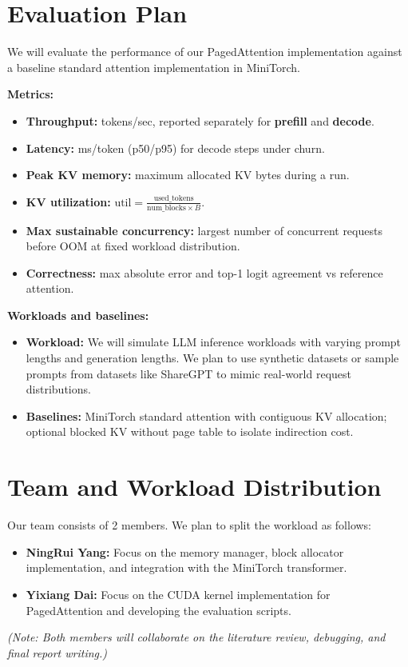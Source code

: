 \documentclass{article}
\begin{document}
\section{Evaluation Plan}
\label{sec:evaluation}

We will evaluate the performance of our PagedAttention implementation against a baseline standard attention implementation in MiniTorch.

\noindent\textbf{Metrics:}
\begin{itemize}
    \item \textbf{Throughput:} tokens/sec, reported separately for \textbf{prefill} and \textbf{decode}.
    \item \textbf{Latency:} ms/token (p50/p95) for decode steps under churn.
    \item \textbf{Peak KV memory:} maximum allocated KV bytes during a run.
    \item \textbf{KV utilization:} $\text{util}=\frac{\text{used\_tokens}}{\text{num\_blocks}\times B}$.
    \item \textbf{Max sustainable concurrency:} largest number of concurrent requests before OOM at fixed workload distribution.
    \item \textbf{Correctness:} max absolute error and top-1 logit agreement vs reference attention.
\end{itemize}

\noindent\textbf{Workloads and baselines:}
\begin{itemize}
    \item \textbf{Workload:} We will simulate LLM inference workloads with varying prompt lengths and generation lengths. We plan to use synthetic datasets or sample prompts from datasets like ShareGPT to mimic real-world request distributions.
    \item \textbf{Baselines:} MiniTorch standard attention with contiguous KV allocation; optional blocked KV without page table to isolate indirection cost.
\end{itemize}

\section{Team and Workload Distribution}
\label{sec:team}

Our team consists of 2 members. We plan to split the workload as follows:
\begin{itemize}
    \item \textbf{NingRui Yang:} Focus on the memory manager, block allocator implementation, and integration with the MiniTorch transformer.
    \item \textbf{Yixiang Dai:} Focus on the CUDA kernel implementation for PagedAttention and developing the evaluation scripts.
\end{itemize}
\textit{(Note: Both members will collaborate on the literature review, debugging, and final report writing.)}
\end{document}

